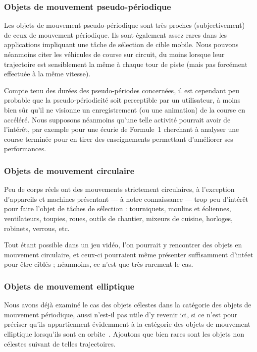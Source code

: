 	
	\subsubsection{Objets de mouvement pseudo-périodique}
	Les objets de mouvement pseudo-périodique sont très proches (subjectivement) de ceux de mouvement périodique. Ils sont également assez rares dans les applications impliquant une tâche de sélection de cible mobile. Nous pouvons néanmoins citer les véhicules de course sur circuit, du moins lorsque leur trajectoire est sensiblement la même à chaque tour de piste (mais pas forcément effectuée à la même vitesse).
	
	Compte tenu des durées des pseudo-périodes concernées, il est cependant peu probable que la pseudo-périodicité soit perceptible par un utilisateur, à moins bien sûr qu'il ne visionne un enregistrement (ou une animation) de la course en accéléré. Nous supposons néanmoins qu'une telle activité pourrait avoir de l'intérêt, par exemple pour une écurie de Formule~1 cherchant à analyser une course terminée pour en tirer des enseignements permettant d'améliorer ses performances.
	
	\subsubsection{Objets de mouvement circulaire}
	Peu de corps réels ont des mouvements strictement circulaires, à l'exception d'appareils et machines présentant --- à notre connaissance --- trop peu d'intérêt pour faire l'objet de tâches de sélection : tourniquets, moulins et éoliennes, ventilateurs, toupies, roues, outils de chantier, mixeurs de cuisine, horloges, robinets, verrous, etc.
	
	Tout étant possible dans un jeu vidéo, l'on pourrait y rencontrer des objets en mouvement circulaire, et ceux-ci pourraient même présenter suffisamment d'intéet pour être ciblés ; néanmoins, ce n'est que très rarement le cas.
	
	\subsubsection{Objets de mouvement elliptique}
	Nous avons déjà examiné le cas des objets célestes dans la catégorie des objets de mouvement périodique, aussi n'est-il pas utile d'y revenir ici, si ce n'est pour préciser qu'ils appartiennent évidemment à la catégorie des objets de mouvement elliptique lorsqu'ils sont en orbite~\cite{kepler1953epitome}. Ajoutons que bien rares sont les objets non célestes suivant de telles trajectoires.
	
